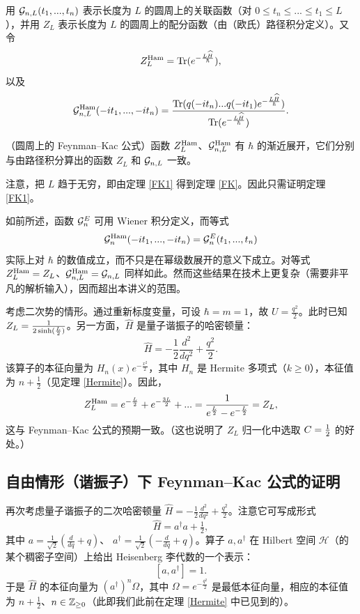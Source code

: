 用 $\G_{n,L}(t_1,...,t_n)$ 表示长度为 $L$ 的圆周上的关联函数（对 $0\le t_n\le...\le t_1\le L$），并用 $Z_{L}$ 表示长度为 $L$ 的圆周上的配分函数（由（欧氏）路径积分定义）。又令
$$
Z_{L}^{\rm Ham}=\Tr(e^{-\frac{L\widehat H}{\hbar}}),
$$  
以及
$$
\G_{n,L}^{\rm Ham}(-it_1,...,-it_n)=\frac{\Tr(q(-it_n)...q(-it_1)e^{-\frac{L\widehat
    H}{\hbar}})}{\Tr(e^{-\frac{L\widehat H}{\hbar}})}.
$$

\begin{theorem}\label{FK1} （圆周上的 Feynman–Kac 公式）函数 $Z_{L}^{\rm Ham}$、$\G_{n,L}^{\rm Ham}$ 有 $\hbar$ 的渐近展开，它们分别与由路径积分算出的函数 $Z_{L}$ 和 $\G_{n,L}$ 一致。
\end{theorem}

注意，把 $L$ 趋于无穷，即由定理 \ref{FK1} 得到定理 \ref{FK}。因此只需证明定理 \ref{FK1}。

\begin{remark} 如前所述，函数 $\G_n^E$ 可用 Wiener 积分定义，而等式
$$
\G_n^{\rm Ham}(-it_1,...,-it_n)=
\G_n^E(t_1,...,t_n)
$$ 
实际上对 $\hbar$ 的数值成立，而不只是在幂级数展开的意义下成立。对等式 $Z_L^{\rm Ham}=Z_L$、$\G_{n,L}^{\rm Ham}=\G_{n,L}$ 同样如此。然而这些结果在技术上更复杂（需要非平凡的解析输入），因而超出本讲义的范围。
\end{remark}

\begin{example}\label{benchoi} 考虑二次势的情形。通过重新标度变量，可设 $\hbar=m=1$，故 $U=\frac{q^2}{2}$。此时已知 $Z_L=\frac{1}{2\sinh({L\over 2})}$。另一方面，$\widehat H$ 是量子谐振子的哈密顿量：
$$
\widehat H=-\frac{1}{2}\frac{d^2}{dq^2}+\frac{q^2}{2}.
$$
该算子的本征向量为 $H_n(x)e^{-\frac{x^2}{2}}$，其中 $H_n$ 是 Hermite 多项式（$k\ge 0$），本征值为 $n+\frac{1}{2}$（见定理 \ref{Hermite}）。因此，
$$
Z_L^{\rm Ham}=e^{-{L\over 2}}+e^{-{3L\over 2}}+...=\frac{1}{e^{L\over 2}-e^{-{L\over 2}}}=Z_L,
$$
这与 Feynman–Kac 公式的预期一致。（这也说明了 $Z_L$ 归一化中选取 $C={1\over 2}$ 的好处。）
\end{example}

\subsection{自由情形（谐振子）下 Feynman–Kac 公式的证明}\label{harosc3}

再次考虑量子谐振子的二次哈密顿量
$\widehat H=-\frac{1}{2}\frac{d^2}{dq^2}+\frac{q^2}{2}$。注意它可写成形式
$$
\widehat H=a^\dagger a+\tfrac{1}{2},
$$
其中 $a=\frac{1}{\sqrt{2}}(\frac{d}{dq}+q)$、
$a^\dagger=\frac{1}{\sqrt{2}}
(-\frac{d}{dq}+q)$。算子 $a,a^\dagger$ 在 Hilbert 空间 $\mathcal H$（的某个稠密子空间）上给出 Heisenberg 李代数的一个表示：
$$
[a,a^\dagger]=1.
$$
于是 $\widehat H$ 的本征向量为 $(a^\dagger)^n\Omega$，其中 $\Omega=e^{-\frac{q^2}{2}}$ 是最低本征向量，相应的本征值为 $n+\frac{1}{2}$、$n\in \Bbb Z_{\ge 0}$（此即我们此前在定理 \ref{Hermite} 中已见到的）。

